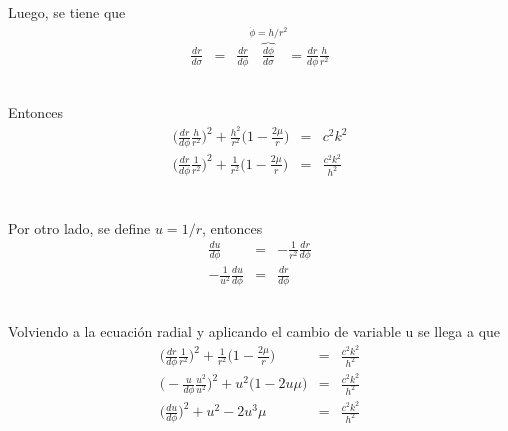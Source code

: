 \documentclass[xcolor=dvipsnames]{beamer}
\begin{document}
  
  \begin{frame}{}
    \begin{block}{}
    Luego, se tiene que
          \begin{eqnarray*}
          \frac{dr}{d\sigma}&=&\frac{dr}{d\phi}\overbrace{\frac{d\phi}{d\sigma}}^{\dot{\phi}=h/r^{2}}=\frac{dr}{d\phi}\frac{h}{r^{2}}
        \end{eqnarray*}\\
    \end{block}
    \begin{block}{}
    Entonces
    \begin{eqnarray*}
    \Big(\frac{dr}{d\phi}\frac{h}{r^{2}}\Big)^{2}+\frac{h^2}{r^{2}}\Big( 1- \frac{2\mu}{r}\Big)&=& c^{2}k^{2}\\
    \Big(\frac{dr}{d\phi}\frac{1}{r^{2}}\Big)^{2}+\frac{1}{r^{2}}\Big( 1- \frac{2\mu}{r}\Big)&=&\frac{c^{2}k^{2}}{h^{2}} \\
    \end{eqnarray*}\\
    \end{block}
    
  \end{frame}
  
  
    \begin{frame}{}
    \begin{block}{}
    Por otro lado, se define $u=1/r$, entonces
          \begin{eqnarray*}
          \frac{du}{d\phi}&=&-\frac{1}{r^{2}}\frac{dr}{d\phi}\\
          -\frac{1}{u^{2}}\frac{du}{d\phi}&=&\frac{dr}{d\phi}
        \end{eqnarray*}\\
    \end{block}
    \begin{block}{}
    Volviendo a la ecuación radial y aplicando el cambio de variable u se llega a que
    \begin{eqnarray*}
    \Big(\frac{dr}{d\phi}\frac{1}{r^{2}}\Big)^{2}+\frac{1}{r^{2}}\Big( 1- \frac{2\mu}{r}\Big)&=&\frac{c^{2}k^{2}}{h^{2}} \\
    \Big(-\frac{u}{d\phi}\frac{u^{2}}{u^{2}}\Big)^{2}+u^{2}\Big( 1- 2u\mu\Big)&=&\frac{c^{2}k^{2}}{h^{2}} \\
    \Big(\frac{du}{d\phi}\Big)^{2}+u^{2}- 2u^{3}\mu&=&\frac{c^{2}k^{2}}{h^{2}} 
    \end{eqnarray*}\\    
    \end{block}
  \end{frame}
\end{document}

